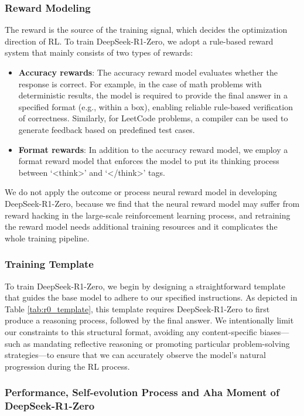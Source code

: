 \documentclass[11pt, a4paper, logo, copyright, nonumbering]{deepseek}
\newcommand{\dsro}{DeepSeek-R1-Zero}
\begin{document}
\subsubsection{Reward Modeling} The reward is the source of the training signal, which decides the optimization direction of RL.
To train \dsro{}, we adopt a rule-based reward system that mainly consists of two types of rewards: 
\begin{itemize}[topsep=0pt]
    \item \textbf{Accuracy rewards}: The accuracy reward model evaluates whether the response is correct. For example, in the case of math problems with deterministic results, the model is required to provide the final answer in a specified format (e.g., within a box), enabling reliable rule-based verification of correctness. Similarly, for LeetCode problems, a compiler can be used to generate feedback based on predefined test cases.
    \item \textbf{Format rewards}: In addition to the accuracy reward model, we employ a format reward model that enforces the model to put its thinking process between `<think>' and `</think>' tags.
\end{itemize}
We do not apply the outcome or process neural reward model in developing  \dsro{}, because we find that the neural reward model may suffer from reward hacking in the large-scale reinforcement learning process, and retraining the reward model needs additional training resources and it complicates the whole training pipeline.


\subsubsection{Training Template}

To train \dsro{}, we begin by designing a straightforward template that guides the base model to adhere to our specified instructions. As depicted in Table \ref{tab:r0_template}, this template requires \dsro{} to first produce a reasoning process, followed by the final answer. We intentionally limit our constraints to this structural format, avoiding any content-specific biases—such as mandating reflective reasoning or promoting particular problem-solving strategies—to ensure that we can accurately observe the model's natural progression during the RL process.



\subsubsection{Performance, Self-evolution Process and Aha Moment of \dsro{}}
\end{document}
